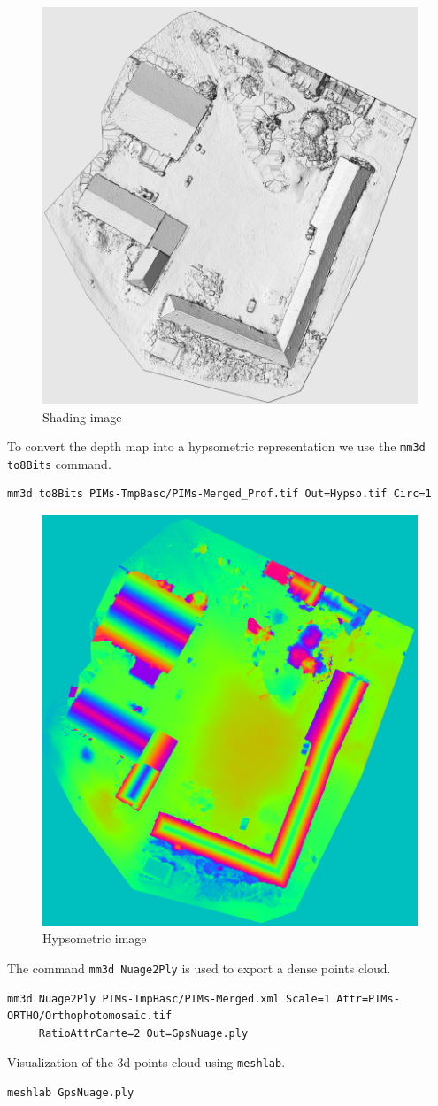 \begin{figure}[H]
    \begin{center}
    \setlength{\unitlength}{0.5cm}
    \includegraphics[width=0.4\linewidth]{FIGS/Viabon/shading.png}
    \end{center}
    \caption{Shading image}
    \label{fig:sel}
\end{figure}

To convert the depth map into a hypsometric representation we use the {\tt mm3d to8Bits} command.
\begin{verbatim}
mm3d to8Bits PIMs-TmpBasc/PIMs-Merged_Prof.tif Out=Hypso.tif Circ=1
\end{verbatim}

\begin{figure}[H]
    \begin{center}
    \setlength{\unitlength}{0.5cm}
    \includegraphics[width=0.4\linewidth]{FIGS/Viabon/hypso.png}
    \end{center}
    \caption{Hypsometric image}
    \label{fig:sel}
\end{figure}

The command {\tt mm3d Nuage2Ply} is used to export a dense points cloud.
\begin{verbatim}
mm3d Nuage2Ply PIMs-TmpBasc/PIMs-Merged.xml Scale=1 Attr=PIMs-ORTHO/Orthophotomosaic.tif 
     RatioAttrCarte=2 Out=GpsNuage.ply
\end{verbatim}

Visualization of the 3d points cloud using {\tt meshlab}.
\begin{verbatim}
meshlab GpsNuage.ply
\end{verbatim}
